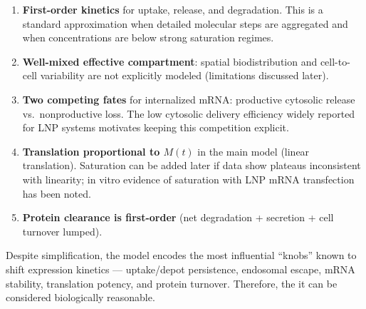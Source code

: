 \begin{enumerate}[label=\arabic*.]
    \item \textbf{First-order kinetics} for uptake, release, and degradation. This is a standard approximation when detailed molecular steps are aggregated and when concentrations are below strong saturation regimes. \parencite{pardi2015expressionKinetics}
    \item \textbf{Well-mixed effective compartment}: spatial biodistribution and cell-to-cell variability are not explicitly modeled (limitations discussed later).
    \item \textbf{Two competing fates} for internalized mRNA: productive cytosolic release vs.~nonproductive loss. The low cytosolic delivery efficiency widely reported for LNP systems motivates keeping this competition explicit. \parencite{Pei2025EndosomalEscapeLNP}
    \item \textbf{Translation proportional to $M(t)$} in the main model (linear translation). Saturation can be added later if data show plateaus inconsistent with linearity; in vitro evidence of saturation with LNP mRNA transfection has been noted. \parencite{pardi2015expressionKinetics}
    \item \textbf{Protein clearance is first-order} (net degradation + secretion + cell turnover lumped).
\end{enumerate}

Despite simplification, the model encodes the most influential ``knobs'' known to shift expression kinetics --- uptake/depot persistence, endosomal escape, mRNA stability, translation potency, and protein turnover. Therefore, the it can be considered biologically reasonable.